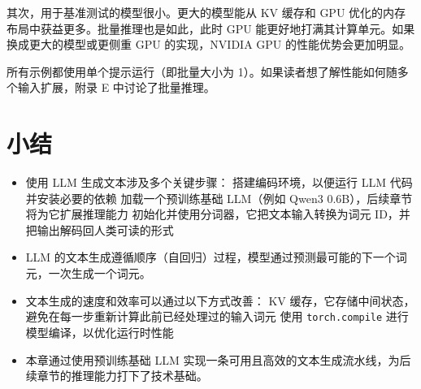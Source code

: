 其次，用于基准测试的模型很小。更大的模型能从 KV 缓存和 GPU 优化的内存布局中获益更多。批量推理也是如此，此时 GPU 能更好地打满其计算单元。如果换成更大的模型或更侧重 GPU 的实现，NVIDIA GPU 的性能优势会更加明显。

所有示例都使用单个提示运行（即批量大小为 1）。如果读者想了解性能如何随多个输入扩展，附录 E 中讨论了批量推理。

\section{小结}

\begin{itemize}
\item 使用 LLM 生成文本涉及多个关键步骤： 搭建编码环境，以便运行 LLM 代码并安装必要的依赖 加载一个预训练基础 LLM（例如 Qwen3 0.6B），后续章节将为它扩展推理能力 初始化并使用分词器，它把文本输入转换为词元 ID，并把输出解码回人类可读的形式
\item LLM 的文本生成遵循顺序（自回归）过程，模型通过预测最可能的下一个词元，一次生成一个词元。
\item 文本生成的速度和效率可以通过以下方式改善： KV 缓存，它存储中间状态，避免在每一步重新计算此前已经处理过的输入词元 使用 \texttt{torch.compile} 进行模型编译，以优化运行时性能
\item 本章通过使用预训练基础 LLM 实现一条可用且高效的文本生成流水线，为后续章节的推理能力打下了技术基础。
\end{itemize}
